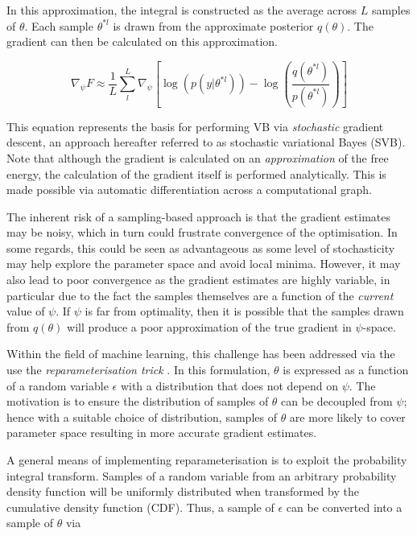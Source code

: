 \documentclass[12pt]{report}
\begin{document}
In this approximation, the integral is constructed as the average across $L$ samples of $\theta$. Each sample $\theta^{*l}$ is drawn from the approximate posterior $q(\theta)$. The gradient can then be calculated on this approximation. 

\begin{equation}
\nabla_{\psi} F \approx \frac{1}{L} \sum^{L}_{l} \nabla_{\psi} \left[ \log( p(y|\theta^{*l}) ) - \log \left( \frac{q(\theta^{*l})}{p(\theta^{*l})} \right) \right]
\end{equation}

This equation represents the basis for performing VB via \textit{stochastic} gradient descent, an approach hereafter referred to as stochastic variational Bayes (SVB). Note that although the gradient is calculated on an \textit{approximation} of the free energy, the calculation of the gradient itself is performed analytically. This is made possible via automatic differentiation across a computational graph. 

The inherent risk of a sampling-based approach is that the gradient estimates may be noisy, which in turn could frustrate convergence of the optimisation. In some regards, this could be seen as advantageous as some level of stochasticity may help explore the parameter space and avoid local minima. However, it may also lead to poor convergence as the gradient estimates are highly variable, in particular due to the fact the samples themselves are a function of the \textit{current} value of $\psi$. If $\psi$ is far from optimality, then it is possible that the samples drawn from $q(\theta)$ will produce a poor approximation of the true gradient in $\psi$-space. 

Within the field of machine learning, this challenge has been addressed via the use the \textit{reparameterisation trick} \cite{Kingma2013}. In this formulation, $\theta$ is expressed as a function of a random variable $\epsilon$ with a distribution that does not depend on $\psi$. The motivation is to ensure the distribution of samples of $\theta$ can be decoupled from $\psi$; hence with a suitable choice of distribution, samples of $\theta$ are more likely to cover parameter space resulting in more accurate gradient estimates. 

A general means of implementing reparameterisation is to exploit the probability integral transform. Samples of a random variable from an arbitrary probability density function will be uniformly distributed when transformed by the cumulative density function (CDF). Thus, a sample of $\epsilon$ can be converted into a sample of $\theta$ via
\end{document}
